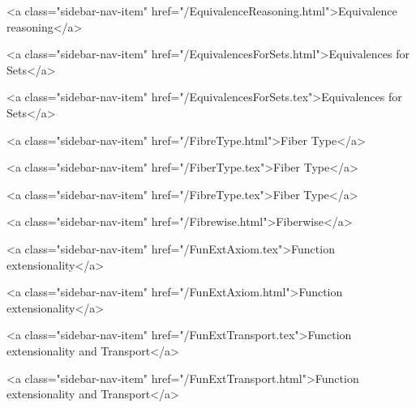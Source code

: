       
        
          <a class="sidebar-nav-item" href="/EquivalenceReasoning.html">Equivalence reasoning</a>
        
      
    
      
        
          <a class="sidebar-nav-item" href="/EquivalencesForSets.html">Equivalences for Sets</a>
        
      
    
      
        
          <a class="sidebar-nav-item" href="/EquivalencesForSets.tex">Equivalences for Sets</a>
        
      
    
      
        
          <a class="sidebar-nav-item" href="/FibreType.html">Fiber Type</a>
        
      
    
      
        
          <a class="sidebar-nav-item" href="/FiberType.tex">Fiber Type</a>
        
      
    
      
        
          <a class="sidebar-nav-item" href="/FibreType.tex">Fiber Type</a>
        
      
    
      
        
          <a class="sidebar-nav-item" href="/Fibrewise.html">Fiberwise</a>
        
      
    
      
        
          <a class="sidebar-nav-item" href="/FunExtAxiom.tex">Function extensionality</a>
        
      
    
      
        
          <a class="sidebar-nav-item" href="/FunExtAxiom.html">Function extensionality</a>
        
      
    
      
        
          <a class="sidebar-nav-item" href="/FunExtTransport.tex">Function extensionality and Transport</a>
        
      
    
      
        
          <a class="sidebar-nav-item" href="/FunExtTransport.html">Function extensionality and Transport</a>
        
